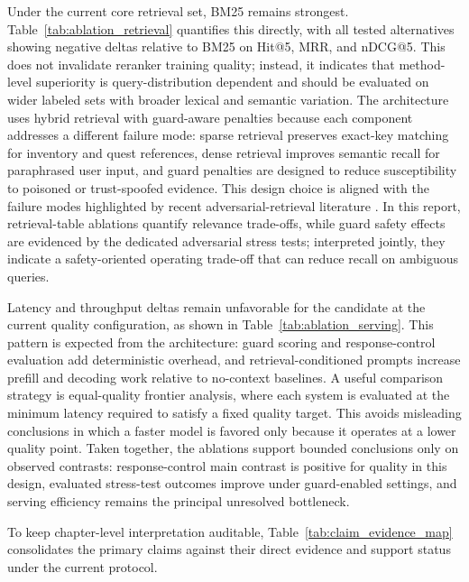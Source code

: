 ﻿\documentclass[a4paper,12pt]{article}
\begin{document}
Under the current core retrieval set, BM25 remains strongest. Table~\ref{tab:ablation_retrieval} quantifies this directly, with all tested alternatives showing negative deltas relative to BM25 on Hit@5, MRR, and nDCG@5. This does not invalidate reranker training quality; instead, it indicates that method-level superiority is query-distribution dependent and should be evaluated on wider labeled sets with broader lexical and semantic variation. The architecture uses hybrid retrieval with guard-aware penalties because each component addresses a different failure mode: sparse retrieval preserves exact-key matching for inventory and quest references, dense retrieval improves semantic recall for paraphrased user input, and guard penalties are designed to reduce susceptibility to poisoned or trust-spoofed evidence. This design choice is aligned with the failure modes highlighted by recent adversarial-retrieval literature \cite{Zou2025PoisonedRAG,Chaturvedi2025AIP}. In this report, retrieval-table ablations quantify relevance trade-offs, while guard safety effects are evidenced by the dedicated adversarial stress tests; interpreted jointly, they indicate a safety-oriented operating trade-off that can reduce recall on ambiguous queries.

Latency and throughput deltas remain unfavorable for the candidate at the current quality configuration, as shown in Table~\ref{tab:ablation_serving}. This pattern is expected from the architecture: guard scoring and response-control evaluation add deterministic overhead, and retrieval-conditioned prompts increase prefill and decoding work relative to no-context baselines. A useful comparison strategy is equal-quality frontier analysis, where each system is evaluated at the minimum latency required to satisfy a fixed quality target. This avoids misleading conclusions in which a faster model is favored only because it operates at a lower quality point. Taken together, the ablations support bounded conclusions only on observed contrasts: response-control main contrast is positive for quality in this design, evaluated stress-test outcomes improve under guard-enabled settings, and serving efficiency remains the principal unresolved bottleneck.

To keep chapter-level interpretation auditable, Table~\ref{tab:claim_evidence_map} consolidates the primary claims against their direct evidence and support status under the current protocol.
\end{document}

